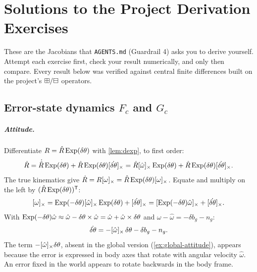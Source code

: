 \chapter{Solutions to the Project Derivation Exercises}
\label{app:solutions}

\begin{pitfall}
These are the Jacobians that \texttt{AGENTS.md} (Guardrail 4) asks you to derive yourself. Attempt each exercise first, check your
result numerically, and only then compare. Every result below was verified against central finite differences built on the project's
$\boxplus/\boxminus$ operators.
\end{pitfall}

\section{Error-state dynamics \texorpdfstring{$F_c$}{Fc} and \texorpdfstring{$G_c$}{Gc}}
\label{sol:Fc}

\paragraph{Attitude.} Differentiate $R = \hat R\operatorname{Exp}(\delta\theta)$ with \cref{lem:dexp}, to first order:
\begin{equation*}
  \dot R = \dot{\hat R}\operatorname{Exp}(\delta\theta) + \hat R\operatorname{Exp}(\delta\theta)[\dot{\delta\theta}]_{\times}
         = \hat R[\hat\omega]_{\times}\operatorname{Exp}(\delta\theta) + \hat R\operatorname{Exp}(\delta\theta)[\dot{\delta\theta}]_{\times} .
\end{equation*}
The true kinematics give $\dot R = R[\omega]_{\times} = \hat R\operatorname{Exp}(\delta\theta)[\omega]_{\times}$. Equate and multiply on the left by $(\hat R\operatorname{Exp}(\delta\theta))^{\mathsf{T}}$:
\begin{equation*}
  [\omega]_{\times} = \operatorname{Exp}(-\delta\theta)[\hat\omega]_{\times}\operatorname{Exp}(\delta\theta) + [\dot{\delta\theta}]_{\times} = [\operatorname{Exp}(-\delta\theta)\hat\omega]_{\times} + [\dot{\delta\theta}]_{\times} .
\end{equation*}
With $\operatorname{Exp}(-\delta\theta)\hat\omega \approx \hat\omega - \delta\theta\times\hat\omega = \hat\omega + \hat\omega\times\delta\theta$ and $\omega - \hat\omega = -\delta b_g - n_g$:
\begin{equation}
  \dot{\delta\theta} = -[\hat\omega]_{\times}\,\delta\theta - \delta b_g - n_g .
\end{equation}
The term $-[\hat\omega]_{\times}\delta\theta$, absent in the global version (\cref{ex:global-attitude}), appears because the error is expressed in body axes
that rotate with angular velocity $\hat\omega$. An error fixed in the world appears to rotate backwards in the body frame.

